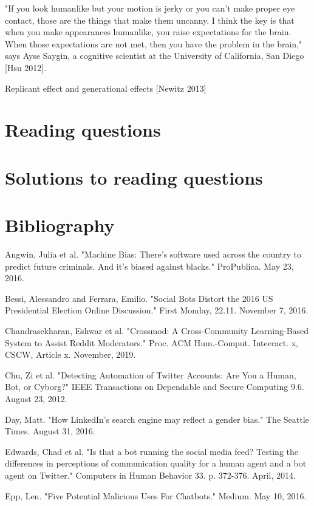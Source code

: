 \documentclass[class=book, crop=false]{standalone}
\begin{document}
"If you look humanlike but your motion is jerky or you can't make proper eye contact, those are the things that make them uncanny. I think the key is that when you make appearances humanlike, you raise expectations for the brain. When those expectations are not met, then you have the problem in the brain," says Ayse Saygin, a cognitive scientist at the University of California, San Diego [Hsu 2012].

Replicant effect and generational effects [Newitz 2013]

\section{Reading questions}

\section{Solutions to reading questions}

\section{Bibliography}

Angwin, Julia et al. "Machine Bias: There's software used across the country to predict future criminals. And it's biased against blacks." ProPublica. May 23, 2016.

Bessi, Alessandro and Ferrara, Emilio. "Social Bots Distort the 2016 US Presidential Election Online Discussion." First Monday, 22.11. November 7, 2016.

Chandrasekharan, Eshwar et al. "Crossmod: A Cross-Community Learning-Based System to Assist Reddit Moderators." Proc. ACM Hum.-Comput. Inteeract. x, CSCW, Article x. November, 2019.

Chu, Zi et al. "Detecting Automation of Twitter Accounts: Are You a Human, Bot, or Cyborg?" IEEE Transactions on Dependable and Secure Computing 9.6. August 23, 2012.

Day, Matt. "How LinkedIn's search engine may reflect a gender bias." The Seattle Times. August 31, 2016.

Edwards, Chad et al. "Is that a bot running the social media feed? Testing the differences in perceptions of communication quality for a human agent and a bot agent on Twitter." Computers in Human Behavior 33. p. 372-376. April, 2014.

Epp, Len. "Five Potential Malicious Uses For Chatbots." Medium. May 10, 2016.
\end{document}
